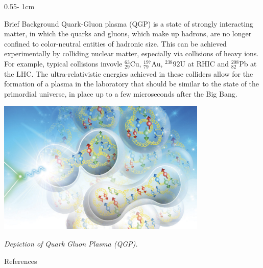 \documentclass{../psuposter}
\begin{document}
\begin{frame}
\begin{columns}[t, totalwidth=\textwidth]
\begin{column}{0.55\textwidth - 1cm}
    \begin{block}{Brief Background}
    	Quark-Gluon plasma (QGP) is a state of strongly interacting matter, in which the quarks and gluons, which make up hadrons, are no longer confined to color-neutral entities of hadronic size. This can be achieved experimentally by colliding nuclear matter, especially via collisions of heavy ions. For example, typical collisions invovle ${}^{63}_{29}$Cu, ${}^{197}_{79}$Au, ${}^{238}{92}$U at RHIC and ${}^{208}_{82}$Pb at the LHC. The ultra-relativistic energies achieved in these colliders allow for the formation of a plasma in the laboratory that should be similar to the state of the primordial universe, in place up to a few microseconds after the Big Bang. \cite{maireIntroductionQuarkGluonPlasma2015}
        \begin{center}
		   	\includegraphics[width=0.75\textwidth]{images/background}    
		   	
		   	\textit{Depiction of Quark Gluon Plasma (QGP).}
		   	\cite{khalekScienceRequirementsDetector2021}
    	\end{center}
    \end{block}


    \begin{block}{References}
        
%        
		
    \end{block}

\end{column}
\end{columns}



\end{frame}
\end{document}

